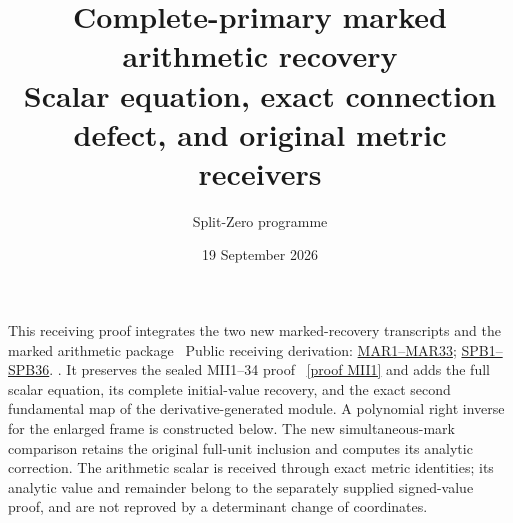 \documentclass[11pt]{article}
\title{Complete-primary marked arithmetic recovery\\
\large Scalar equation, exact connection defect, and original metric receivers}
\author{Split-Zero programme}
\date{19 September 2026}
\begin{document}
\maketitle

This receiving proof integrates the two new marked-recovery transcripts
and the marked arithmetic package \cite{arrival}%
~Public receiving derivation: \href{https://github.com/KokunoYumeto/zeta-function-research-reader/blob/689a8f87e9c12b7a99b01b3123438c6751ee608f/workbenches/splitzero-tandem/continuations/20260920-native-heat-action/providers/MARKED_ARITHMETIC_RECOVERY.tex\#L39}{MAR1--MAR33}; \href{https://github.com/KokunoYumeto/zeta-function-research-reader/blob/689a8f87e9c12b7a99b01b3123438c6751ee608f/workbenches/splitzero-tandem/continuations/20260920-native-heat-action/providers/MARKED_ARITHMETIC_RECOVERY.tex\#L646}{SPB1--SPB36}.%
{}. It preserves the sealed
MII1--34 proof \cite{mii}%
~\href{https://github.com/KokunoYumeto/zeta-function-research-reader/blob/487253b5b01851da5b9b98af4e146fecf1fab902/workbenches/splitzero-tandem/continuations/20260919-arithmetic-signs-marked-classes/first_intake/marked_image/MARKED_IMAGE_RECEIVING_PROOF.tex\#L44}{[proof MII1]}%
{} and adds the full scalar equation, its complete
initial-value recovery, and the exact second fundamental map of the
derivative-generated module. A polynomial right inverse for the enlarged
frame is constructed below. The new simultaneous-mark comparison retains
the original full-unit inclusion and computes its analytic correction.
The arithmetic scalar is received through exact metric identities; its
analytic value and remainder belong to the separately supplied signed-value
proof, and are not reproved by a determinant change of coordinates.
\end{document}
